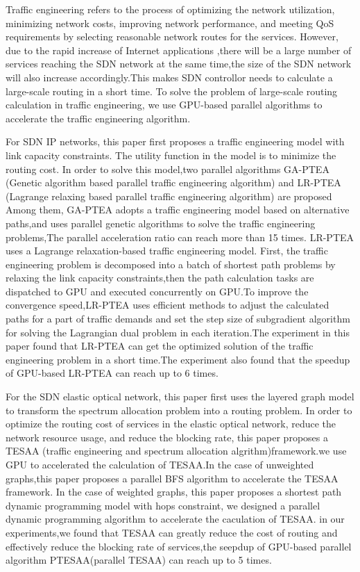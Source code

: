 \documentclass[master]{thesis-uestc}
\begin{document}
\begin{englishabstract}

Traffic engineering refers to the process of optimizing the network utilization, minimizing network costs, improving network performance, and meeting QoS requirements by selecting reasonable network routes for the services. However, due to the rapid increase of Internet applications ,there will be a large number of services reaching the SDN network at the same time,the size of the SDN network will also increase accordingly.This makes SDN controllor needs to calculate a large-scale routing in a short time. To solve the problem of large-scale routing calculation in traffic engineering, we use GPU-based parallel algorithms to accelerate the traffic engineering algorithm.

For SDN IP networks, this paper first proposes a traffic engineering model with link capacity constraints. The utility function in the model is to minimize the routing cost. In order to solve this model,two parallel algorithms GA-PTEA (Genetic algorithm based parallel traffic engineering algorithm) and LR-PTEA (Lagrange relaxing based parallel traffic engineering algorithm) are proposed
Among them, GA-PTEA adopts a traffic engineering model based on alternative paths,and uses parallel genetic algorithms to solve the traffic engineering problems,The parallel acceleration ratio can reach more than 15 times. LR-PTEA uses a Lagrange relaxation-based traffic engineering model. First, the traffic engineering problem is decomposed into a batch of shortest path problems by relaxing the link capacity constraints,then the path calculation tasks are dispatched to GPU and executed concurrently on GPU.To improve the convergence speed,LR-PTEA uses efficient methods to adjust the calculated paths for a part of traffic demands and set the step size of subgradient algorithm for solving the Lagrangian dual problem in each iteration.The experiment in this paper found that LR-PTEA can get the optimized solution of the traffic engineering problem in a short time.The experiment also found that the speedup of GPU-based LR-PTEA can reach up to 6 times.

For the SDN elastic optical network, this paper first uses the layered graph model to transform the spectrum allocation problem into a routing problem. In order to optimize the routing cost of services in the elastic optical network, reduce the network resource usage, and reduce the blocking rate, this paper proposes a TESAA (traffic engineering and spectrum allocation algrithm)framework.we use GPU to accelerated the calculation of TESAA.In the case of unweighted graphs,this paper proposes a parallel BFS algorithm to accelerate the TESAA framework. In the case of weighted graphs, this paper proposes a shortest path dynamic programming model with hops constraint, we designed a parallel dynamic programming algorithm to accelerate the caculation of TESAA. in our experiments,we found that TESAA can greatly reduce the cost of routing and effectively reduce the blocking rate of services,the seepdup of GPU-based parallel algorithm PTESAA(parallel TESAA) can reach up to 5 times.

\end{englishabstract}
\end{document}
